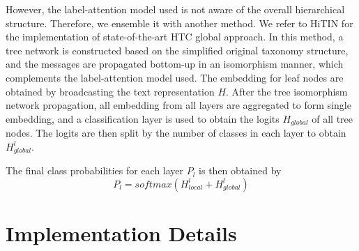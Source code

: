 However, the label-attention model used is not aware of the overall hierarchical structure. Therefore, we ensemble it with another method. We refer to HiTIN \cite{Zhu2023HiTINHT} for the implementation of state-of-the-art HTC global approach. In this method, a tree network is constructed based on the simplified original taxonomy structure, and the messages are propagated bottom-up in an isomorphism manner, which complements the label-attention model used. The embedding for leaf nodes are obtained by broadcasting the text representation $H$. After the tree isomorphism network propagation, all embedding from all layers are aggregated to form single embedding, and a classification layer is used to obtain the logits $H_{global}$ of all tree nodes. The logits are then split by the number of classes in each layer to obtain $H_{global}^l$.

The final class probabilities for each layer $P_l$ is then obtained by
$$ P_l = softmax(H_{local}^l + H_{global}^l) $$



\section{Implementation Details}
\label{appendix:b}



